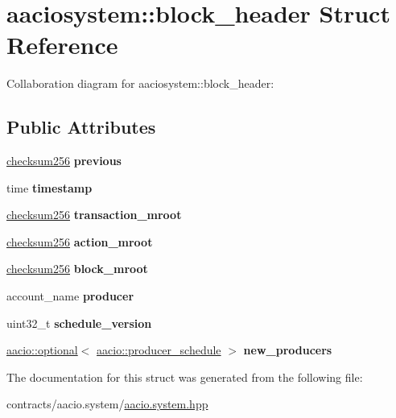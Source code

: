\hypertarget{structaaciosystem_1_1block__header}{}\section{aaciosystem\+:\+:block\+\_\+header Struct Reference}
\label{structaaciosystem_1_1block__header}


Collaboration diagram for aaciosystem\+:\+:block\+\_\+header\+:
\subsection*{Public Attributes}
\begin{DoxyCompactItemize}
\item 
\mbox{\label{structaaciosystem_1_1block__header_ae88320eee29377330bedb278d12d74ee}} 
\mbox{\hyperlink{structchecksum256}{checksum256}} {\bfseries previous}
\item 
\mbox{\label{structaaciosystem_1_1block__header_a712820ff4b0fbab0b8fbdc71ad36a682}} 
time {\bfseries timestamp}
\item 
\mbox{\label{structaaciosystem_1_1block__header_ada1fcaf50c2e9709e7b22edd83241337}} 
\mbox{\hyperlink{structchecksum256}{checksum256}} {\bfseries transaction\+\_\+mroot}
\item 
\mbox{\label{structaaciosystem_1_1block__header_a025a8c6b9bccd8e1407993e252a0fa0c}} 
\mbox{\hyperlink{structchecksum256}{checksum256}} {\bfseries action\+\_\+mroot}
\item 
\mbox{\label{structaaciosystem_1_1block__header_a981b9fa905d0f819717c0fd450930dce}} 
\mbox{\hyperlink{structchecksum256}{checksum256}} {\bfseries block\+\_\+mroot}
\item 
\mbox{\label{structaaciosystem_1_1block__header_a8fa2f5425c60d2315ed349186d4db14a}} 
account\+\_\+name {\bfseries producer}
\item 
\mbox{\label{structaaciosystem_1_1block__header_a72a7cb690a98974918552e882f49eddb}} 
uint32\+\_\+t {\bfseries schedule\+\_\+version}
\item 
\mbox{\label{structaaciosystem_1_1block__header_a75d4dd4d2d7ff5003bf0aa9496a554ac}} 
\mbox{\hyperlink{classaacio_1_1optional}{aacio\+::optional}}$<$ \mbox{\hyperlink{structaacio_1_1producer__schedule}{aacio\+::producer\+\_\+schedule}} $>$ {\bfseries new\+\_\+producers}
\end{DoxyCompactItemize}


The documentation for this struct was generated from the following file\+:\begin{DoxyCompactItemize}
\item 
contracts/aacio.\+system/\mbox{\hyperlink{aacio_8system_8hpp}{aacio.\+system.\+hpp}}\end{DoxyCompactItemize}
